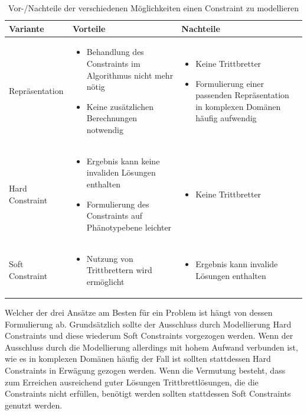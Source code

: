 \begin{table}[h]
	\begin{tabularx}{.9\textwidth}{lXX}\hline
		Variante 		& Vorteile 		& Nachteile \\ \hline
		Repräsentation 	& 
		\begin{itemize}
			\item Behandlung des Constraints im Algorithmus nicht mehr nötig
			\item Keine zusätzlichen Berechnungen notwendig
		\end{itemize} &
		\begin{itemize}
			\item Keine Trittbretter
			\item Formulierung einer passenden Repräsentation in komplexen Domänen häufig aufwendig
		\end{itemize} \\
		Hard Constraint &
		\begin{itemize}
			\item Ergebnis kann keine invaliden Lösungen enthalten
			\item Formulierung des Constraints auf Phänotypebene leichter
		\end{itemize} &
		\begin{itemize}
			\item Keine Trittbretter
		\end{itemize} \\
		Soft Constraint &
		\begin{itemize}
			\item Nutzung von Trittbrettern wird ermöglicht
		\end{itemize} &
		\begin{itemize}
			\item Ergebnis kann invalide Lösungen enthalten
		\end{itemize} \\
	\end{tabularx}
	\caption{Vor-/Nachteile der verschiedenen Möglichkeiten einen Constraint zu modellieren}
	\label{tab:methods_constraint}
\end{table}
	


Welcher der drei Ansätze am Besten für ein Problem ist hängt von dessen Formulierung ab.
Grundsätzlich sollte der Ausschluss durch Modellierung Hard Constraints und diese wiederum Soft Constraints vorgezogen werden.
Wenn der Ausschluss durch die Modellierung allerdings mit hohem Aufwand verbunden ist, wie es in komplexen Domänen häufig der Fall ist sollten stattdessen Hard Constraints in Erwägung gezogen werden.
Wenn die Vermutung besteht, dass zum Erreichen ausreichend guter Lösungen Trittbrettlösungen, die die Constraints nicht erfüllen, benötigt werden sollten stattdessen Soft Constraints genutzt werden.

